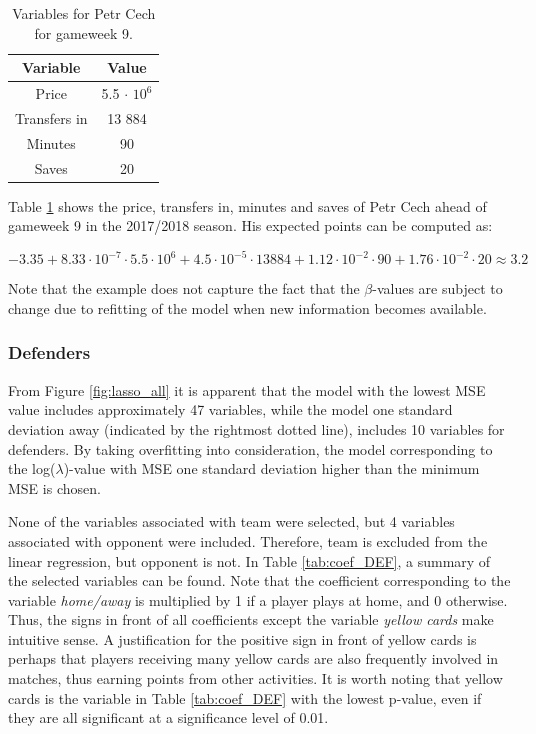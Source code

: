 \begin{table}[!htb]
\centering
\begin{tabular}{|c|c|}
\hline
Variable     & Value   \\ \hline
Price         & 5.5 $\cdot$ $10^6$ \\
Transfers in & 13 884   \\
Minutes      & 90      \\
Saves        & 20     \\
\hline
\end{tabular}
\caption{Variables for Petr Cech for gameweek 9.}
\label{tab:var_petr}
\end{table}

\newpar

Table \ref{tab:var_petr} shows the price, transfers in, minutes and saves of Petr Cech ahead of gameweek 9 in the 2017/2018 season. His expected points can be computed as:

\begin{equation*}
    -3.35 + 8.33 \cdot 10^{-7} \cdot 5.5 \cdot 10^6 + 4.5 \cdot 10^{-5} \cdot 13 884 + 1.12 \cdot 10^{-2} \cdot 90 + 1.76 \cdot 10^{-2} \cdot 20 \approx 3.2
\end{equation*}

Note that the example does not capture the fact that the $\beta$-values are subject to change due to refitting of the model when new information becomes available.


\subsubsection{Defenders}

From Figure \ref{fig:lasso_all} it is apparent that the model with the lowest MSE value includes approximately 47 variables, while the model one standard deviation away (indicated by the rightmost dotted line), includes 10 variables for defenders. By taking overfitting into consideration, the model corresponding to the log($\lambda$)-value with MSE one standard deviation higher than the minimum MSE is chosen.

\newpar

None of the variables associated with team were selected, but 4 variables associated with opponent were included. Therefore, team is excluded from the linear regression, but opponent is not. In Table \ref{tab:coef_DEF}, a summary of the selected variables can be found. Note that the coefficient corresponding to the variable \textit{home/away} is multiplied by 1 if a player plays at home, and 0 otherwise. Thus, the signs in front of all coefficients except the variable \textit{yellow cards} make intuitive sense. A justification for the positive sign in front of yellow cards is perhaps that players receiving many yellow cards are also frequently involved in matches, thus earning points from other activities. It is worth noting that yellow cards is the variable in Table \ref{tab:coef_DEF} with the lowest p-value, even if they are all significant at a significance level of 0.01.

